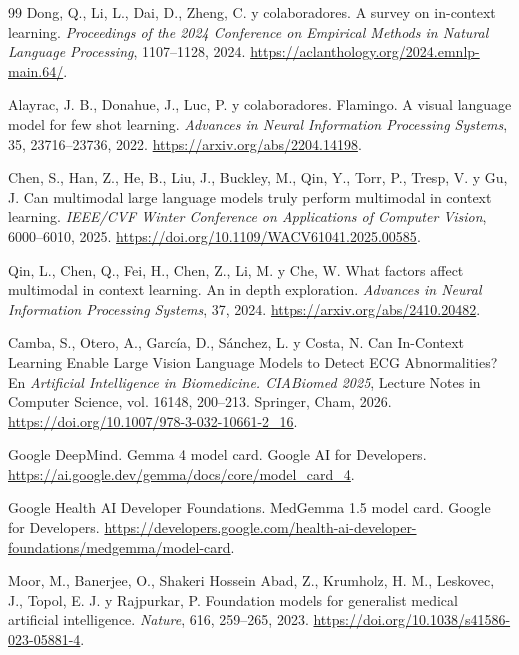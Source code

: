 \begin{thebibliography}{99}
Dong, Q., Li, L., Dai, D., Zheng, C. y colaboradores.
\newblock A survey on in-context learning.
\newblock \emph{Proceedings of the 2024 Conference on Empirical Methods in Natural Language Processing}, 1107--1128, 2024.
\newblock \url{https://aclanthology.org/2024.emnlp-main.64/}.

Alayrac, J. B., Donahue, J., Luc, P. y colaboradores.
\newblock Flamingo. A visual language model for few shot learning.
\newblock \emph{Advances in Neural Information Processing Systems}, 35, 23716--23736, 2022.
\newblock \url{https://arxiv.org/abs/2204.14198}.

Chen, S., Han, Z., He, B., Liu, J., Buckley, M., Qin, Y., Torr, P., Tresp, V. y Gu, J.
\newblock Can multimodal large language models truly perform multimodal in context learning.
\newblock \emph{IEEE/CVF Winter Conference on Applications of Computer Vision}, 6000--6010, 2025.
\newblock \url{https://doi.org/10.1109/WACV61041.2025.00585}.

Qin, L., Chen, Q., Fei, H., Chen, Z., Li, M. y Che, W.
\newblock What factors affect multimodal in context learning. An in depth exploration.
\newblock \emph{Advances in Neural Information Processing Systems}, 37, 2024.
\newblock \url{https://arxiv.org/abs/2410.20482}.

Camba, S., Otero, A., García, D., Sánchez, L. y Costa, N.
\newblock Can In-Context Learning Enable Large Vision Language Models to Detect ECG Abnormalities?
\newblock En \emph{Artificial Intelligence in Biomedicine. CIABiomed 2025}, Lecture Notes in Computer Science, vol. 16148, 200--213. Springer, Cham, 2026.
\newblock \url{https://doi.org/10.1007/978-3-032-10661-2_16}.

Google DeepMind.
\newblock Gemma 4 model card.
\newblock Google AI for Developers.
\newblock \url{https://ai.google.dev/gemma/docs/core/model_card_4}.

Google Health AI Developer Foundations.
\newblock MedGemma 1.5 model card.
\newblock Google for Developers.
\newblock \url{https://developers.google.com/health-ai-developer-foundations/medgemma/model-card}.

Moor, M., Banerjee, O., Shakeri Hossein Abad, Z., Krumholz, H. M., Leskovec, J., Topol, E. J. y Rajpurkar, P.
\newblock Foundation models for generalist medical artificial intelligence.
\newblock \emph{Nature}, 616, 259--265, 2023.
\newblock \url{https://doi.org/10.1038/s41586-023-05881-4}.


\end{thebibliography}
